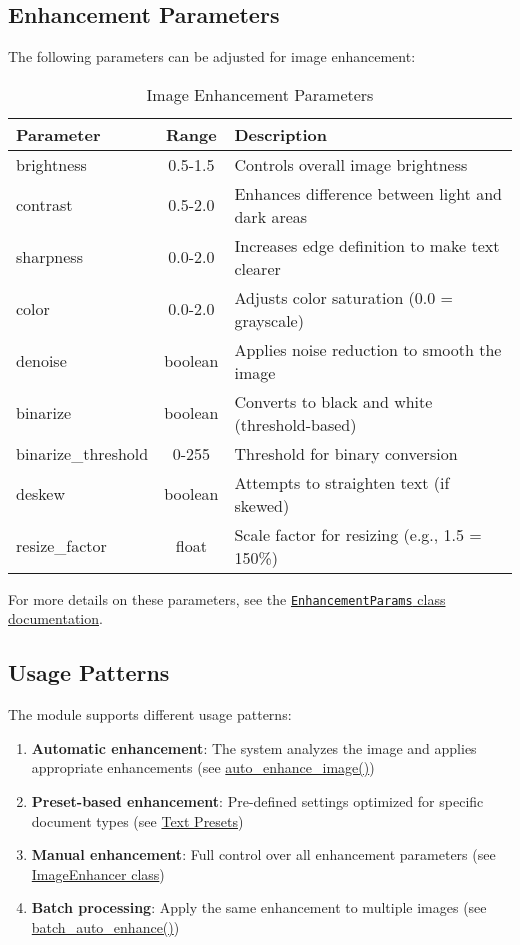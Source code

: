\subsection{Enhancement Parameters}
The following parameters can be adjusted for image enhancement:

\begin{table}[h]
\centering
\begin{tabular}{|l|c|p{7cm}|}
\hline
\textbf{Parameter} & \textbf{Range} & \textbf{Description} \\
\hline
brightness & 0.5-1.5 & Controls overall image brightness \\
\hline
contrast & 0.5-2.0 & Enhances difference between light and dark areas \\
\hline
sharpness & 0.0-2.0 & Increases edge definition to make text clearer \\
\hline
color & 0.0-2.0 & Adjusts color saturation (0.0 = grayscale) \\
\hline
denoise & boolean & Applies noise reduction to smooth the image \\
\hline
binarize & boolean & Converts to black and white (threshold-based) \\
\hline
binarize\_threshold & 0-255 & Threshold for binary conversion \\
\hline
deskew & boolean & Attempts to straighten text (if skewed) \\
\hline
resize\_factor & float & Scale factor for resizing (e.g., 1.5 = 150\%) \\
\hline
\end{tabular}
\caption{Image Enhancement Parameters}
\end{table}

For more details on these parameters, see the \hyperref[sec:enhancer]{\texttt{EnhancementParams} class documentation}.

\subsection{Usage Patterns}
The module supports different usage patterns:

\begin{enumerate}
    \item \textbf{Automatic enhancement}: The system analyzes the image and applies appropriate enhancements (see \hyperref[sec:auto_enhance_function]{auto\_enhance\_image()})
    \item \textbf{Preset-based enhancement}: Pre-defined settings optimized for specific document types (see \hyperref[sec:text_presets]{Text Presets})
    \item \textbf{Manual enhancement}: Full control over all enhancement parameters (see \hyperref[sec:enhancer_class]{ImageEnhancer class})
    \item \textbf{Batch processing}: Apply the same enhancement to multiple images (see \hyperref[sec:batch_enhance]{batch\_auto\_enhance()})
\end{enumerate}

